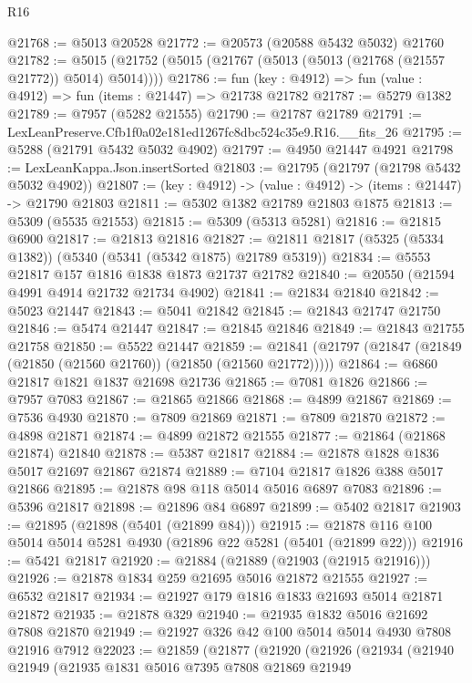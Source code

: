 \begin{lexlean}{R16}
\begin{coremodule}
@21768 := @5013 @20528
@21772 := @20573 (@20588 @5432 @5032) @21760
@21782 := @5015 (@21752 (@5015 (@21767 (@5013 (@5013 (@21768 (@21557 @21772)) @5014) @5014))))
@21786 := fun (key : @4912) => fun (value : @4912) => fun (items : @21447) => @21738 @21782
@21787 := @5279 @1382
@21789 := @7957 (@5282 @21555)
@21790 := @21787 @21789
@21791 := LexLeanPreserve.Cfb1f0a02e181ed1267fc8dbc524c35e9.R16.__fits_26
@21795 := @5288 (@21791 @5432 @5032 @4902)
@21797 := @4950 @21447 @4921
@21798 := LexLeanKappa.Json.insertSorted
@21803 := @21795 (@21797 (@21798 @5432 @5032 @4902))
@21807 := (key : @4912) -> (value : @4912) -> (items : @21447) -> @21790 @21803
@21811 := @5302 @1382 @21789 @21803 @1875
@21813 := @5309 (@5535 @21553)
@21815 := @5309 (@5313 @5281)
@21816 := @21815 @6900
@21817 := @21813 @21816
@21827 := @21811 @21817 (@5325 (@5334 @1382)) (@5340 (@5341 (@5342 @1875) @21789 @5319))
@21834 := @5553 @21817 @157 @1816 @1838 @1873 @21737 @21782
@21840 := @20550 (@21594 @4991 @4914 @21732 @21734 @4902)
@21841 := @21834 @21840
@21842 := @5023 @21447
@21843 := @5041 @21842
@21845 := @21843 @21747 @21750
@21846 := @5474 @21447
@21847 := @21845 @21846
@21849 := @21843 @21755 @21758
@21850 := @5522 @21447
@21859 := @21841 (@21797 (@21847 (@21849 (@21850 (@21560 @21760)) (@21850 (@21560 @21772)))))
@21864 := @6860 @21817 @1821 @1837 @21698 @21736
@21865 := @7081 @1826
@21866 := @7957 @7083
@21867 := @21865 @21866
@21868 := @4899 @21867
@21869 := @7536 @4930
@21870 := @7809 @21869
@21871 := @7809 @21870
@21872 := @4898 @21871
@21874 := @4899 @21872 @21555
@21877 := @21864 (@21868 @21874) @21840
@21878 := @5387 @21817
@21884 := @21878 @1828 @1836 @5017 @21697 @21867 @21874
@21889 := @7104 @21817 @1826 @388 @5017 @21866
@21895 := @21878 @98 @118 @5014 @5016 @6897 @7083
@21896 := @5396 @21817
@21898 := @21896 @84 @6897
@21899 := @5402 @21817
@21903 := @21895 (@21898 (@5401 (@21899 @84)))
@21915 := @21878 @116 @100 @5014 @5014 @5281 @4930 (@21896 @22 @5281 (@5401 (@21899 @22)))
@21916 := @5421 @21817
@21920 := @21884 (@21889 (@21903 (@21915 @21916)))
@21926 := @21878 @1834 @259 @21695 @5016 @21872 @21555
@21927 := @6532 @21817
@21934 := @21927 @179 @1816 @1833 @21693 @5014 @21871 @21872
@21935 := @21878 @329
@21940 := @21935 @1832 @5016 @21692 @7808 @21870
@21949 := @21927 @326 @42 @100 @5014 @5014 @4930 @7808 @21916 @7912
@22023 := @21859
    (@21877
      (@21920
        (@21926
          (@21934
            (@21940
              @21949
              (@21935
                @1831
                @5016
                @7395
                @7808
                @21869
                @21949

\end{coremodule}
\end{lexlean}
